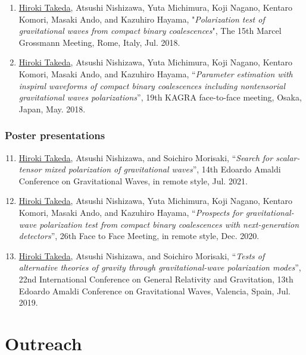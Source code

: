 \documentclass[uplatex, 12pt]{article}
\begin{document}
\begin{enumerate}
\item \uline{Hiroki Takeda}, Atsushi Nishizawa, Yuta Michimura, Koji Nagano, Kentaro Komori, Masaki Ando, and Kazuhiro Hayama, "\emph{Polarization test of gravitational waves from compact binary coalescences}", The 15th Marcel Grossmann Meeting, Rome, Italy, Jul. 2018.\\

\item \uline{Hiroki Takeda}, Atsushi Nishizawa, Yuta Michimura, Koji Nagano, Kentaro Komori, Masaki Ando, and Kazuhiro Hayama, “\emph{Parameter estimation with inspiral waveforms of compact binary coalescences including nontensorial gravitational waves polarizations}”, 19th KAGRA face-to-face meeting, Osaka, Japan, May. 2018.
\end{enumerate}

\subsubsection*{Poster presentations}

\begin{enumerate}
\setcounter{enumi}{10}
\item \uline{Hiroki Takeda}, Atsushi Nishizawa, and Soichiro Morisaki, “\emph{Search for scalar-tensor mixed polarization of gravitational waves}”, 14th Edoardo Amaldi Conference on Gravitational Waves, in remote style, Jul. 2021.\\

\item \uline{Hiroki Takeda}, Atsushi Nishizawa, Yuta Michimura, Koji Nagano, Kentaro Komori, Masaki Ando, and Kazuhiro Hayama, “\emph{Prospects for gravitational-wave polarization test from compact binary coalescences with next-generation detectors}”, 26th Face to Face Meeting, in remote style, Dec. 2020.\\

\item \uline{Hiroki Takeda}, Atsushi Nishizawa, and Soichiro Morisaki, “\emph{Tests of alternative theories of gravity through gravitational-wave polarization modes}”, 22nd International Conference on General Relativity and Gravitation, 13th Edoardo Amaldi Conference on Gravitational Waves, Valencia, Spain, Jul. 2019.\\

\end{enumerate}


\section*{Outreach}
\end{document}
